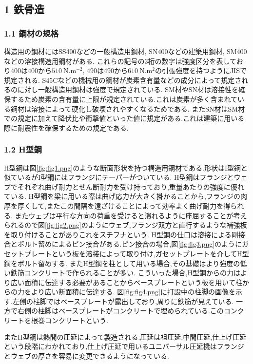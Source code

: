 \subsection*{1 鉄骨造}
\subsubsection*{1.1 鋼材の規格}
構造用の鋼材にはSS400などの一般構造用鋼材, SN400などの建築用鋼材, SM400などの溶接構造用鋼材がある.
これらの記号の3桁の数字は強度区分を表しており$400$は$400$から$510\ \si{\newton.\metre^{-2}}$, $490$は$490$から$610\ \si{\newton.\metre^2}$の引張強度を持つようにJISで規定される.\cite{tekkotuQA28:online}
S45Cなどの機械用の鋼材が炭素含有量などの成分によって規定されるのに対し一般構造用鋼材は強度で規定されている.
SM材やSN材は溶接性を確保するため炭素の含有量に上限が規定されている.これは炭素が多く含まれている鋼材は溶接によって硬化し破壊されやすくなるためである.
またSN材はSM材での規定に加えて降伏比や衝撃値といった値に規定がある.これは建築に用いる際に耐震性を確保するための規定である.\cite{tekkotuQA28:online}
\subsubsection*{1.2 H型鋼}
H型鋼は図\ref{fig:fig1.png}のような断面形状を持つ構造用鋼材である.形状はI型鋼と似ているがI型鋼にはフランジにテーパーがついている.
H型鋼はフランジとウェブでそれぞれ曲げ耐力とせん断耐力を受け持っており,重量あたりの強度に優れている.
H型鋼を梁に用いる際は曲げ応力が大きく掛かることから,フランジの肉厚を厚くして,またこの間隔を遠ざけることによって効率よく曲げ耐力を得られる.
またウェブは平行な方向の荷重を受けると潰れるように座屈することが考えられるので図\ref{fig:fig2.png}のようにウェブ,フランジ双方と直行するような補強板を取り付けることがありこれをスチフナという.
H型鋼の仕口は溶接による剛接合とボルト留めによるピン接合がある.ピン接合の場合,図\ref{fig:fig3.png}のようにガセットプレートという板を溶接によって取り付け,ガセットプレートを介してH型鋼をボルト留めする.
またH型鋼を柱として用いる場合,その基礎はより強度の低い鉄筋コンクリートで作られることが多い.
こういった場合,H型鋼からの力はより広い面積に伝達する必要があることからベースプレートという板を用いて柱からの力をより広い断面積に伝達する.
図\ref{fig:fig4.png}に打設中の柱脚の画像を示す.左側の柱脚ではベースプレートが露出しており,周りに鉄筋が見えている.
一方で右側の柱脚はベースプレートがコンクリートで埋められている.このコンクリートを根巻コンクリートという.

またH型鋼は熱間の圧延によって製造される.圧延は祖圧延,中間圧延,仕上げ圧延という段階にわかれており,仕上げ圧延で用いるユニバーサル圧延機はフランジとウェブの厚さを容易に変更できるようになっている.\cite{Hgatakou:online}

